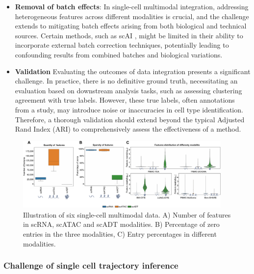 \begin{itemize}
	\item \textbf{Removal of batch effects}: 
	In single-cell multimodal integration, addressing heterogeneous features across different modalities is crucial, and the challenge extends to mitigating batch effects arising from both biological and technical sources. Certain methods, such as scAI \citep{jin2020scai}, might be limited in their ability to incorporate external batch correction techniques, potentially leading to confounding results from combined batches and biological variations.

	\item \textbf{Validation} 
	Evaluating the outcomes of data integration presents a significant challenge. In practice, there is no definitive ground truth, necessitating an evaluation based on downstream analysis tasks, such as assessing clustering agreement with true labels. However, these true labels, often annotations from a study, may introduce noise or inaccuracies in cell type identification. Therefore, a thorough validation should extend beyond the typical Adjusted Rand Index (ARI) to comprehensively assess the effectiveness of a method.
\end{itemize}

\begin{figure}[!ht]
	\centering
	\includegraphics[width=0.95\textwidth]{feature_statistic/fig}
	\vspace{0.1cm}
	\caption[features characteristics comparison showing the challenge of multimodal integration.]{Illustration of six single-cell multimodal data. A) Number of features in scRNA, scATAC and scADT modalities. B) Percentage of zero entries in the three modalities, C) Entry percentages in different modalities.}
	\label{fig:modalities_differences}
\end{figure}


\subsubsection{Challenge of single cell trajectory inference}
\label{background:sec2:challenge_TI}

